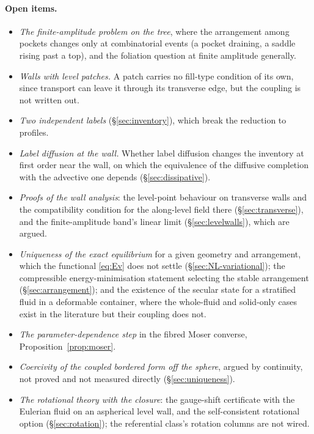 \documentclass[11pt]{article}
\theoremstyle{definition}
\theoremstyle{remark}
\begin{document}
\paragraph{Open items.}
\begin{itemize}
\item \emph{The finite-amplitude problem on the tree}, where the
  arrangement among pockets changes only at combinatorial events (a
  pocket draining, a saddle rising past a top), and the foliation
  question at finite amplitude generally.
\item \emph{Walls with level patches.} A patch carries no fill-type
  condition of its own, since transport can leave it through its
  transverse edge, but the coupling is not written out.
\item \emph{Two independent labels} (\S\ref{sec:inventory}), which break
  the reduction to profiles.
\item \emph{Label diffusion at the wall.} Whether label diffusion
  changes the inventory at first order near the wall, on which the
  equivalence of the diffusive completion with the advective one
  depends (\S\ref{sec:dissipative}).
\item \emph{Proofs of the wall analysis}: the level-point behaviour on
  transverse walls and the compatibility condition for the along-level
  field there (\S\ref{sec:transverse}), and the finite-amplitude band's
  linear limit (\S\ref{sec:levelwalls}), which are argued.
\item \emph{Uniqueness of the exact equilibrium} for a given geometry and
  arrangement, which the functional \eqref{eq:Ev} does not settle
  (\S\ref{sec:NL-variational}); the compressible energy-minimisation
  statement selecting the stable arrangement (\S\ref{sec:arrangement});
  and the existence of the secular state for a stratified fluid in a
  deformable container, where the whole-fluid and solid-only cases exist
  in the literature but their coupling does not.
\item \emph{The parameter-dependence step} in the fibred Moser
  converse, Proposition~\ref{prop:moser}.
\item \emph{Coercivity of the coupled bordered form off the sphere},
  argued by continuity, not proved and not measured directly
  (\S\ref{sec:uniqueness}).
\item \emph{The rotational theory with the closure}: the gauge-shift
  certificate with the Eulerian fluid on an aspherical level wall, and
  the self-consistent rotational option (\S\ref{sec:rotation}); the
  referential class's rotation columns are not wired.

\end{itemize}
\end{document}
